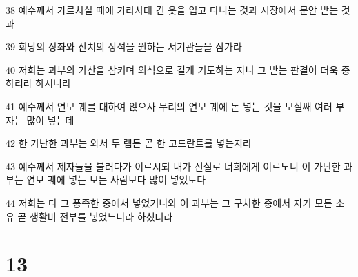 \par 38 예수께서 가르치실 때에 가라사대 긴 옷을 입고 다니는 것과 시장에서 문안 받는 것과
\par 39 회당의 상좌와 잔치의 상석을 원하는 서기관들을 삼가라
\par 40 저희는 과부의 가산을 삼키며 외식으로 길게 기도하는 자니 그 받는 판결이 더욱 중하리라 하시니라
\par 41 예수께서 연보 궤를 대하여 앉으사 무리의 연보 궤에 돈 넣는 것을 보실쌔 여러 부자는 많이 넣는데
\par 42 한 가난한 과부는 와서 두 렙돈 곧 한 고드란트를 넣는지라
\par 43 예수께서 제자들을 불러다가 이르시되 내가 진실로 너희에게 이르노니 이 가난한 과부는 연보 궤에 넣는 모든 사람보다 많이 넣었도다
\par 44 저희는 다 그 풍족한 중에서 넣었거니와 이 과부는 그 구차한 중에서 자기 모든 소유 곧 생활비 전부를 넣었느니라 하셨더라

\chapter{13}

